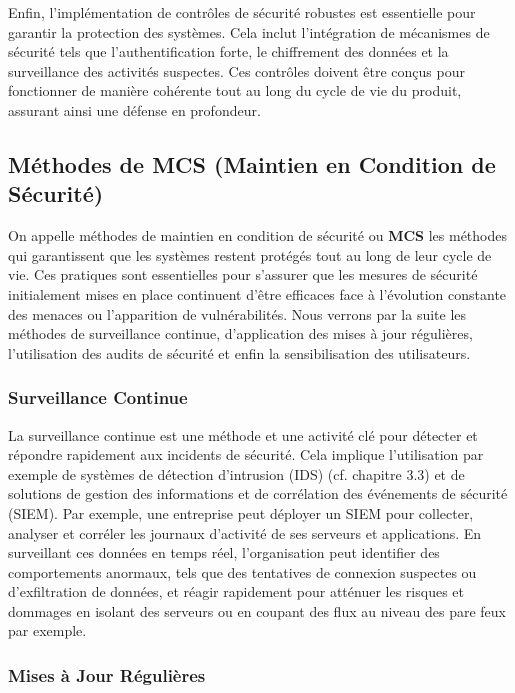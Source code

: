 Enfin, l'implémentation de contrôles de sécurité robustes est essentielle pour garantir la protection des systèmes. Cela inclut l'intégration de mécanismes de sécurité tels que l'authentification forte, le chiffrement des données et la surveillance des activités suspectes. Ces contrôles doivent être conçus pour fonctionner de manière cohérente tout au long du cycle de vie du produit, assurant ainsi une défense en profondeur.

\subsection{Méthodes de MCS (Maintien en Condition de Sécurité)}

On appelle méthodes de maintien en condition de sécurité ou \textbf{MCS} les méthodes qui garantissent que les systèmes restent protégés tout au long de leur cycle de vie. Ces pratiques sont essentielles pour s'assurer que les mesures de sécurité initialement mises en place continuent d'être efficaces face à l'évolution constante des menaces ou l'apparition de vulnérabilités.
Nous verrons par la suite les méthodes de surveillance continue, d'application des mises à jour régulières, l'utilisation des audits de sécurité et enfin la sensibilisation des utilisateurs.

\subsubsection{Surveillance Continue}

La surveillance continue est une méthode et une activité clé pour détecter et répondre rapidement aux incidents de sécurité. Cela implique l'utilisation par exemple de systèmes de détection d'intrusion (IDS) (cf. chapitre 3.3) et de solutions de gestion des informations et de corrélation des événements de sécurité (SIEM). Par exemple, une entreprise peut déployer un SIEM pour collecter, analyser et corréler les journaux d'activité de ses serveurs et applications. En surveillant ces données en temps réel, l'organisation peut identifier des comportements anormaux, tels que des tentatives de connexion suspectes ou d'exfiltration de données, et réagir rapidement pour atténuer les risques et dommages en isolant des serveurs ou en coupant des flux au niveau des pare feux par exemple.

\subsubsection{Mises à Jour Régulières}

